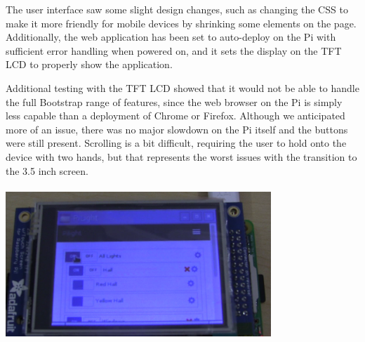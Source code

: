 \documentclass[10pt,draftclsnofoot,onecolumn]{IEEEtran}
\begin{document}
The user interface saw some slight design changes, such as changing the CSS
to make it more friendly for mobile devices by shrinking some elements on the
page. Additionally, the web application has been set to auto-deploy on the Pi
with sufficient error handling when powered on, and it sets the display on the
TFT LCD to properly show the application.

Additional testing with the TFT LCD showed that it would not be
able to handle the full Bootstrap range of features, since the web
browser on the Pi is simply less capable than a deployment of Chrome or
Firefox. Although we anticipated more of an issue, there was no major slowdown
on the Pi itself and the buttons were still present. Scrolling is a bit
difficult, requiring the user to hold onto the device with two hands, 
but that represents the worst issues with the transition to the 3.5 inch screen. \\ \\
\includegraphics[width=0.75\textwidth]{screen.png}
\end{document}
